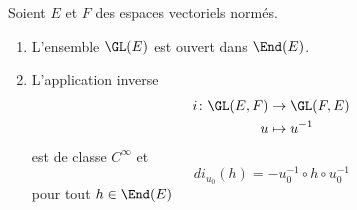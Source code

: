 \begin{theorem}    \label{ThoCINVBTJ}
	Soient \( E\) et \( F\) des espaces vectoriels normés.
	\begin{enumerate}
		\item
		      L'ensemble \( \GL(E)\) est ouvert dans \( \End(E)\).
		\item
		      L'application inverse
		      \begin{equation}
			      \begin{aligned}
				      i\colon \GL(E,F) & \to \GL(F,E)   \\
				      u                & \mapsto u^{-1}
			      \end{aligned}
		      \end{equation}
		      est de classe \( C^{\infty}\) et
		      \begin{equation}
			      di_{u_0}(h)=-u_0^{-1}\circ h\circ u_0^{-1}
		      \end{equation}
		      pour tout \( h\in\End(E)\)
	\end{enumerate}
\end{theorem}

